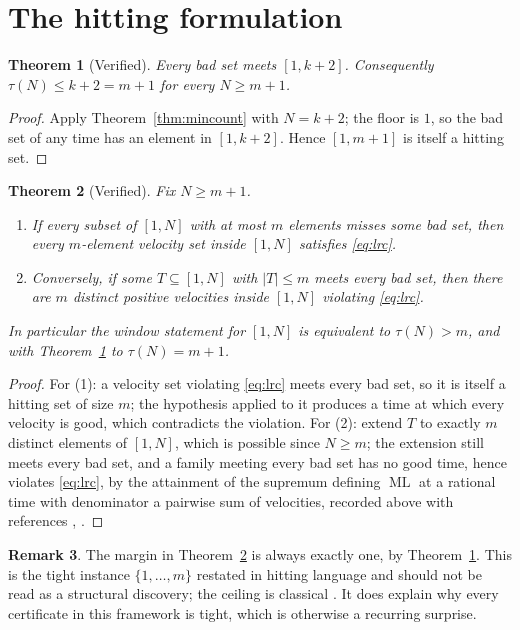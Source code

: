 \documentclass[11pt]{amsart}
\theoremstyle{plain}
\newtheorem{theorem}{Theorem}[section]
\theoremstyle{definition}
\newtheorem{remark}[theorem]{Remark}
\newcommand{\ML}{\operatorname{ML}}
\begin{document}
\section{The hitting formulation}\label{sec:hitting}

\begin{theorem}[Verified]\label{thm:ceiling}
Every bad set meets $[1,k+2]$. Consequently $\tau(N) \le k+2 = m+1$ for every $N \ge m+1$.
\end{theorem}

\begin{proof}
Apply Theorem~\ref{thm:mincount} with $N = k+2$; the floor is $1$, so the bad set of any time has an
element in $[1,k+2]$. Hence $[1,m+1]$ is itself a hitting set.
\end{proof}

\begin{theorem}[Verified]\label{thm:equiv}
Fix $N \ge m+1$.
\begin{enumerate}
\item If every subset of $[1,N]$ with at most $m$ elements misses some bad set, then every
  $m$-element velocity set inside $[1,N]$ satisfies \eqref{eq:lrc}.
\item Conversely, if some $T \subseteq [1,N]$ with $|T| \le m$ meets every bad set, then there are
  $m$ distinct positive velocities inside $[1,N]$ violating \eqref{eq:lrc}.
\end{enumerate}
In particular the window statement for $[1,N]$ is equivalent to $\tau(N) > m$, and with
Theorem~\ref{thm:ceiling} to $\tau(N) = m+1$.
\end{theorem}

\begin{proof}
For (1): a velocity set violating \eqref{eq:lrc} meets every bad set, so it is itself a hitting set
of size $m$; the hypothesis applied to it produces a time at which every velocity is good, which
contradicts the violation. For (2): extend $T$ to exactly $m$ distinct elements of $[1,N]$, which
is possible since $N \ge m$; the extension still meets every bad set, and a family meeting every bad
set has no good time, hence violates \eqref{eq:lrc}, by the attainment of the supremum defining
$\ML$ at a rational time with denominator a pairwise sum of velocities, recorded above with
references \cite[eq.~(4)]{PS}, \cite{Har,CG}.
\end{proof}

\begin{remark}
The margin in Theorem~\ref{thm:equiv} is always exactly one, by Theorem~\ref{thm:ceiling}. This is
the tight instance $\{1,\dots,m\}$ restated in hitting language and should not be read as a
structural discovery; the ceiling is classical \cite[\S4]{PS}. It does explain why every certificate
in this framework is tight, which is otherwise a recurring surprise.
\end{remark}
\end{document}
